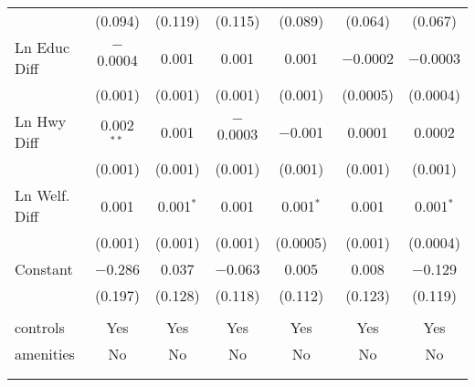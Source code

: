 \begin{table}[!htbp]
\begin{tabular}{@{\extracolsep{5pt}}lcccccc}
  & (0.094) & (0.119) & (0.115) & (0.089) & (0.064) & (0.067) \\ 
  Ln Educ Diff & $-$0.0004 & 0.001 & 0.001 & 0.001 & $-$0.0002 & $-$0.0003 \\ 
  & (0.001) & (0.001) & (0.001) & (0.001) & (0.0005) & (0.0004) \\ 
  Ln Hwy Diff & 0.002$^{**}$ & 0.001 & $-$0.0003 & $-$0.001 & 0.0001 & 0.0002 \\ 
  & (0.001) & (0.001) & (0.001) & (0.001) & (0.001) & (0.001) \\ 
  Ln Welf. Diff & 0.001 & 0.001$^{*}$ & 0.001 & 0.001$^{*}$ & 0.001 & 0.001$^{*}$ \\ 
  & (0.001) & (0.001) & (0.001) & (0.0005) & (0.001) & (0.0004) \\ 
  Constant & $-$0.286 & 0.037 & $-$0.063 & 0.005 & 0.008 & $-$0.129 \\ 
  & (0.197) & (0.128) & (0.118) & (0.112) & (0.123) & (0.119) \\ 
 \hline \\[-1.8ex] 
controls & Yes & Yes & Yes & Yes & Yes & Yes \\ 
amenities & No & No & No & No & No & No \\ 
\hline \\[-1.8ex] 
\hline 
\hline \\[-1.8ex] 
\end{tabular} 
\end{table} 
